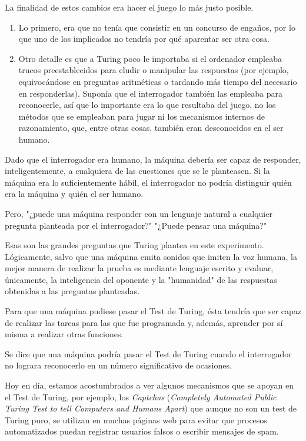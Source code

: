 \documentclass[a4paper, 11pt]{article} %
\begin{document}
 La finalidad de estos cambios era hacer el juego lo más justo posible.
 \begin{enumerate}
     \item Lo primero, era que no tenía que consistir en un concurso de engaños, por lo que uno de los implicados no tendría por qué aparentar ser otra cosa.
     \item Otro detalle es que a Turing poco le importaba si el ordenador empleaba trucos preestablecidos para eludir o manipular las respuestas (por ejemplo, equivocándose en preguntas aritméticas o tardando más tiempo del necesario en responderlas). Suponía que el interrogador también las empleaba para reconocerle, así que lo importante era lo que resultaba del juego, no los métodos que se empleaban para jugar ni los mecanismos internos de razonamiento, que, entre otras cosas, también eran desconocidos en el ser humano.
 \end{enumerate}

Dado que el interrogador era humano, la máquina debería ser capaz de responder, inteligentemente, a cualquiera de las cuestiones que se le planteasen. Si la máquina era lo suficientemente hábil, el interrogador no podría distinguir quién era la máquina y quién el ser humano.

\begin{shaded}
Pero, "¿puede una máquina responder con un lenguaje natural a cualquier pregunta planteada por el interrogador?" "¿Puede pensar una máquina?"
\end{shaded}

Esas son las grandes preguntas que Turing plantea en este experimento. Lógicamente, salvo que una máquina emita sonidos que imiten la voz humana, la mejor manera de realizar la prueba es mediante lenguaje escrito y evaluar, únicamente, la inteligencia del oponente y la "humanidad" de las respuestas obtenidas a las preguntas planteadas.

Para que una máquina pudiese pasar el Test de Turing, ésta tendría que ser capaz de realizar las tareas para las que fue programada y, además, aprender por sí misma a realizar otras funciones.

Se dice que una máquina podría pasar el Test de Turing cuando el interrogador no lograra reconocerlo en un número significativo de ocasiones.

Hoy en día, estamos acostumbrados a ver algunos mecanismos que se apoyan en el Test de Turing, por ejemplo, los \textit{Captchas} (\textit{Completely Automated Public Turing Test to tell Computers and Humans Apart}) que aunque no son un test de Turing puro, se utilizan en muchas páginas web para evitar que procesos automatizados puedan registrar usuarios falsos o escribir mensajes de spam.
\end{document}
